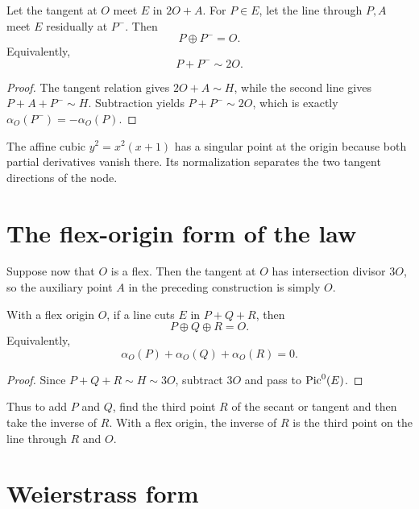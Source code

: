 \begin{proposition}\label{prop:vi43-arbitrary-inverse}
Let the tangent at \(O\) meet \(E\) in \(2O+A\).  For \(P\in E\), let the line through \(P,A\) meet \(E\) residually at \(P^-\).  Then
\[
  P\oplus P^-=O.
\]
Equivalently,
\[
  P+P^-\sim2O.
\]
\end{proposition}

\begin{proof}
The tangent relation gives \(2O+A\sim H\), while the second line gives \(P+A+P^-\sim H\).  Subtraction yields \(P+P^-\sim2O\), which is exactly \(\alpha_O(P^-)= -\alpha_O(P)\).
\end{proof}

\begin{example}\label{ex:vi43-expand-02}
The affine cubic $y^2=x^2(x+1)$ has a singular point at the origin because both partial derivatives vanish there.  Its normalization separates the two tangent directions of the node.
\end{example}
\section{The flex-origin form of the law}

Suppose now that \(O\) is a flex.  Then the tangent at \(O\) has intersection divisor \(3O\), so the auxiliary point \(A\) in the preceding construction is simply \(O\).

\begin{corollary}\label{cor:vi43-collinear-zero}
With a flex origin \(O\), if a line cuts \(E\) in \(P+Q+R\), then
\[
  P\oplus Q\oplus R=O.
\]
Equivalently,
\[
  \alpha_O(P)+\alpha_O(Q)+\alpha_O(R)=0.
\]
\end{corollary}

\begin{proof}
Since \(P+Q+R\sim H\sim3O\), subtract \(3O\) and pass to \(\operatorname{Pic}^0(E)\).
\end{proof}

Thus to add \(P\) and \(Q\), find the third point \(R\) of the secant or tangent and then take the inverse of \(R\).  With a flex origin, the inverse of \(R\) is the third point on the line through \(R\) and \(O\).



\section{Weierstrass form}

